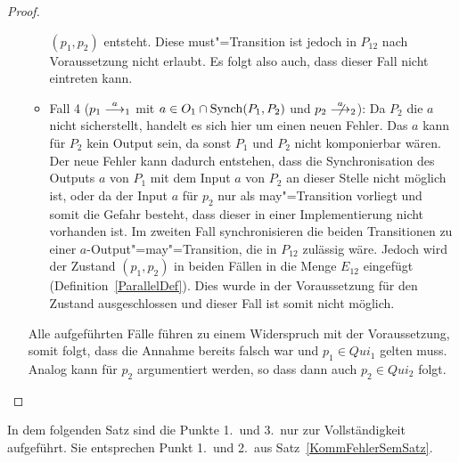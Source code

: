 \begin{proof}
\begin{enumerate}
\begin{itemize}
          $(p_1,p_2)$ entsteht. Diese must"=Transition ist jedoch in $P_{12}$
          nach Voraussetzung nicht erlaubt. Es folgt also auch, dass dieser
          Fall nicht eintreten kann.
        \item Fall 4 \big($p_1\must[a]_1$ mit $a\in O_1\cap\mathrm{Synch}(P_1,P_2)$ und
          $p_2\nmust[a]_2$\big): Da $P_2$ die $a$ nicht sicherstellt, handelt
          es sich hier um einen neuen Fehler. Das $a$ kann für $P_2$ kein
          Output sein, da sonst $P_1$ und $P_2$ nicht komponierbar wären. Der
          neue Fehler kann dadurch entstehen, dass die Synchronisation des
          Outputs $a$ von $P_1$ mit dem Input $a$ von $P_2$ an dieser Stelle
          nicht möglich ist, oder da der Input $a$ für $p_2$ nur als
          may"=Transition vorliegt und somit die Gefahr besteht, dass dieser in
          einer Implementierung nicht vorhanden ist. Im zweiten Fall
          synchronisieren die beiden Transitionen zu einer
          $a$-Output"=may"=Transition, die in $P_{12}$ zulässig wäre. Jedoch
          wird der Zustand $(p_1,p_2)$ in beiden Fällen in die Menge $E_{12}$
          eingefügt (Definition~\ref{ParallelDef}). Dies wurde in der
          Voraussetzung für den Zustand ausgeschlossen und dieser Fall ist
          somit nicht möglich.
      \end{itemize}
      Alle aufgeführten Fälle führen zu einem Widerspruch mit der
      Voraussetzung, somit folgt, dass die Annahme bereits falsch war und
      $p_1\in Qui_1$ gelten muss. Analog kann für $p_2$ argumentiert werden, so
      dass dann auch $p_2\in Qui_2$ folgt.
  \end{enumerate}
\end{proof}

In dem folgenden Satz sind die Punkte 1.\ und 3.\ nur zur Vollständigkeit
aufgeführt. Sie entsprechen Punkt 1.\ und 2.\ aus Satz~\ref{KommFehlerSemSatz}.


